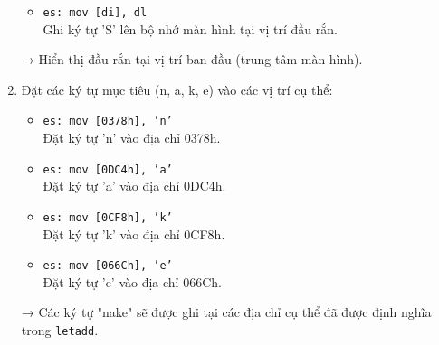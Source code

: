 \documentclass[12pt]{article}
\begin{document}
\begin{enumerate}[label=\textbf{\arabic*.}]
\begin{itemize}
        \item \texttt{es: mov [di], dl} \\
        Ghi ký tự 'S' lên bộ nhớ màn hình tại vị trí đầu rắn.
    \end{itemize}
    → Hiển thị đầu rắn tại vị trí ban đầu (trung tâm màn hình).
    
    \item Đặt các ký tự mục tiêu (n, a, k, e) vào các vị trí cụ thể:
    
    \begin{itemize}
        \item \texttt{es: mov [0378h], 'n'} \\
        Đặt ký tự 'n' vào địa chỉ 0378h.
        
        \item \texttt{es: mov [0DC4h], 'a'} \\
        Đặt ký tự 'a' vào địa chỉ 0DC4h.
        
        \item \texttt{es: mov [0CF8h], 'k'} \\
        Đặt ký tự 'k' vào địa chỉ 0CF8h.
        
        \item \texttt{es: mov [066Ch], 'e'} \\
        Đặt ký tự 'e' vào địa chỉ 066Ch.
    \end{itemize}
    → Các ký tự "nake" sẽ được ghi tại các địa chỉ cụ thể đã được định nghĩa trong \texttt{letadd}.
\end{enumerate}
\end{document}
